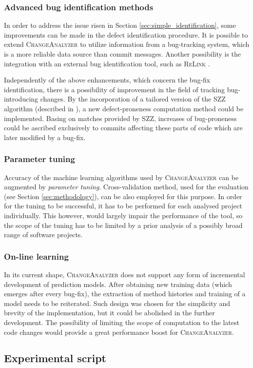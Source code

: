 \documentclass{pracamgr}
\makeatletter
\newcommand{\ca}{\textsc{ChangeAnalyzer}\xspace}
\DeclareRobustCommand\ttfamily
        {\not@math@alphabet\ttfamily\mathtt
         \fontfamily\ttdefault\selectfont\hyphenchar\font=-1\relax}
\makeatother
\begin{document}
\subsection{Advanced bug identification methods}
\label{sec:advanced_identification}
In order to address the issue risen in Section \ref{sec:simple_identification}, some improvements can be made in the defect identification procedure. It is possible to extend \ca to utilize information from a bug-tracking system, which is a more reliable data source than commit messages. Another possibility is the integration with an external bug identification tool, such as \textsc{ReLink} \cite{ReLink}.

Independently of the above enhancements, which concern the bug-fix identification, there is a possibility of improvement in the field of tracking bug-introducing changes. By the incorporation of a tailored version of the SZZ algorithm (described in \cite{SZZ}), a new defect-proneness computation method could be implemented. Basing on matches provided by SZZ, increases of bug-proneness could be ascribed exclusively to commits affecting these parts of code which are later modified by a bug-fix.

\subsection{Parameter tuning}
\label{sec:paramater_tuning}
Accuracy of the machine learning algorithms used by \ca can be augmented by \emph{parameter tuning}. Cross-validation method, used for the evaluation (see Section \ref{sec:methodology}), can be also employed for this purpose. In order for the tuning to be  successful, it has to be performed for each analysed project individually. This however, would largely impair the performance of the tool, so the scope of the tuning has to be limited by a prior analysis of a possibly broad range of software projects.

\subsection{On-line learning}
\label{sec:online_learning}
In its current shape, \ca does not support any form of incremental development of prediction models. After obtaining new training data (which emerges after every bug-fix), the extraction of method histories and training of a model needs to be reiterated. Such design was chosen for the simplicity and brevity of the implementation, but it could be abolished in the further development. The possibility of limiting the scope of computation to the latest code changes would provide a great performance boost for \ca.

\printbibliography[heading=bibintoc]

\begin{appendices}

\chapter{Experimental script}
\label{cha:experimental_script}


\end{appendices}
\end{document}
